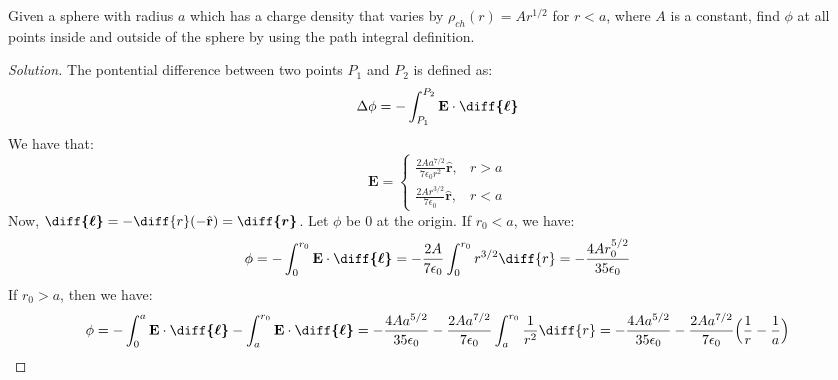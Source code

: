 \documentclass[crop=false,class=article,oneside]{standalone}
\begin{document}
        \begin{problem}[Wangsness 5-10]
            Given a sphere with radius $a$ which has
            a charge density that varies by
            $\rho_{ch}(r)=Ar^{1/2}$ for $r<a$, where $A$
            is a constant, find $\phi$ at all points inside
            and outside of the sphere by using the path
            integral definition.
        \end{problem}
        \begin{proof}[Solution]
            The pontential difference between two points
            $P_{1}$ and $P_{2}$ is defined as:
            \begin{equation*}
                \Delta\phi=-\int_{P_{1}}^{P_{2}}
                \mathbf{E}\cdot\boldsymbol{\diff{\ell}}
            \end{equation*}
            We have that:
            \begin{equation*}
                \mathbf{E}
                =
                \begin{cases}
                    \frac{2Aa^{7/2}}{7\epsilon_{0}r^{2}}
                    \hat{\mathbf{r}},
                    &r>a\\
                    \frac{2Ar^{3/2}}{7\epsilon_{0}}
                    \hat{\mathbf{r}},
                    &r<a
                \end{cases}    
            \end{equation*}
            Now,
            $\boldsymbol{\diff{\ell}}%
             =-\diff{r}(-\hat{\mathbf{r}})%
             =\boldsymbol{\diff{r}}$.
            Let $\phi$ be $0$ at the origin.
            If $r_{0}<a$, we have:
            \begin{equation*}
                \phi
                =-\int_{0}^{r_{0}}
                \mathbf{E}\cdot\boldsymbol{\diff{\ell}}
                =-\frac{2A}{7\epsilon_{0}}
                \int_{0}^{r_{0}}r^{3/2}\diff{r}
                =-\frac{4Ar_{0}^{5/2}}{35\epsilon_{0}}
            \end{equation*}
            If $r_{0}>a$, then we have:
            \begin{equation*}
                \phi
                =-\int_{0}^{a}
                \mathbf{E}\cdot\boldsymbol{\diff{\ell}}
                -\int_{a}^{r_{0}}
                \mathbf{E}\cdot\boldsymbol{\diff{\ell}}
                =-\frac{4Aa^{5/2}}{35\epsilon_{0}}
                -\frac{2Aa^{7/2}}{7\epsilon_{0}}
                \int_{a}^{r_{0}}\frac{1}{r^{2}}\diff{r}
                =-\frac{4Aa^{5/2}}{35\epsilon_{0}}
                -\frac{2Aa^{7/2}}{7\epsilon_{0}}
                \Big(\frac{1}{r}-\frac{1}{a}\Big)
            \end{equation*}
        \end{proof}
\end{document}
